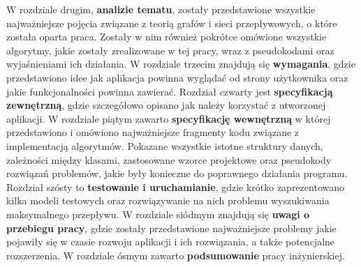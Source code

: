 W rozdziale drugim, \textbf{analizie tematu}, zostały przedstawione wszystkie najważniejsze pojęcia związane z teorią grafów i sieci przepływowych, o które została oparta praca. Zostały w nim również pokrótce omówione wszystkie algorytmy, jakie zostały zrealizowane w tej pracy, wraz z pseudokodami oraz wyjaśnieniami ich działania. W rozdziale trzecim znajdują się \textbf{wymagania}, gdzie przedstawiono idee jak aplikacja powinna wyglądać od strony użytkownika oraz jakie funkcjonalności powinna zawierać. Rozdział czwarty jest \textbf{specyfikacją zewnętrzną}, gdzie szczegółowo opisano jak należy korzystać z utworzonej aplikacji. W rozdziale piątym zawarto \textbf{specyfikację wewnętrzną} w której przedstawiono i omówiono najważniejsze fragmenty kodu związane z implementacją algorytmów. Pokazane wszystkie istotne struktury danych, zależności między klasami, zastosowane wzorce projektowe oraz pseudokody rozwiązań problemów, jakie były konieczne do poprawnego działania programu. Rozdział szósty to \textbf{testowanie i uruchamianie}, gdzie krótko zaprezentowano kilka modeli testowych oraz rozwiązywanie na nich problemu wyszukiwania maksymalnego przepływu. W rozdziale siódmym znajdują się \textbf{uwagi o przebiegu pracy}, gdzie zostały przedstawione najważniejsze problemy jakie pojawiły się w czasie rozwoju aplikacji i ich rozwiązania, a także potencjalne rozszerzenia. W rozdziale ósmym zawarto \textbf{podsumowanie} pracy inżynierskiej.
